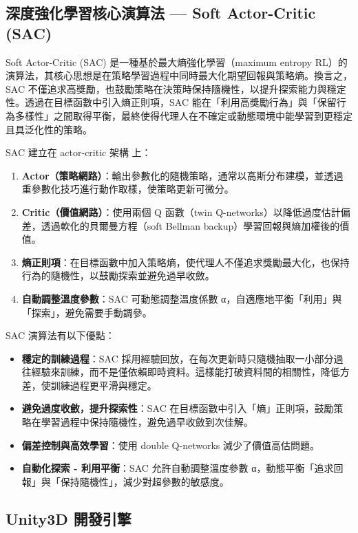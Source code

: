 \documentclass[12pt,a4paper]{ctexart}
\begin{document}
\subsection{深度強化學習核心演算法 — Soft Actor-Critic (SAC)}
Soft Actor-Critic (SAC) 是一種基於最大熵強化學習（maximum entropy RL）的演算法，其核心思想是在策略學習過程中同時最大化期望回報與策略熵。換言之，SAC 不僅追求高獎勵，也鼓勵策略在決策時保持隨機性，以提升探索能力與穩定性。透過在目標函數中引入熵正則項，SAC 能在「利用高獎勵行為」與「保留行為多樣性」之間取得平衡，最終使得代理人在不確定或動態環境中能學習到更穩定且具泛化性的策略。
\\ \par
SAC 建立在 actor-critic 架構 上：
\begin{enumerate}
	\item \textbf{Actor（策略網路）}：輸出參數化的隨機策略，通常以高斯分布建模，並透過重參數化技巧進行動作取樣，使策略更新可微分。
	\item \textbf{Critic（價值網路）}：使用兩個 Q 函數（twin Q-networks）以降低過度估計偏差，透過軟化的貝爾曼方程（soft Bellman backup）學習回報與熵加權後的價值。
	\item \textbf{熵正則項}：在目標函數中加入策略熵，使代理人不僅追求獎勵最大化，也保持行為的隨機性，以鼓勵探索並避免過早收斂。
	\item \textbf{自動調整溫度參數}：SAC 可動態調整溫度係數 α，自適應地平衡「利用」與「探索」，避免需要手動調參。
\end{enumerate}

SAC 演算法有以下優點：
\begin{itemize}
	\item \textbf{穩定的訓練過程}：SAC 採用經驗回放，在每次更新時只隨機抽取一小部分過往經驗來訓練，而不是僅依賴即時資料。這樣能打破資料間的相關性，降低方差，使訓練過程更平滑與穩定。
	\item \textbf{避免過度收斂，提升探索性}：SAC 在目標函數中引入「熵」正則項，鼓勵策略在學習過程中保持隨機性，避免過早收斂到次佳解。
	\item \textbf{偏差控制與高效學習}：使用 double Q-networks 減少了價值高估問題。
	\item \textbf{自動化探索 - 利用平衡}：SAC 允許自動調整溫度參數 α，動態平衡「追求回報」與「保持隨機性」，減少對超參數的敏感度。
\end{itemize}

\subsection{Unity3D 開發引擎}
\end{document}

